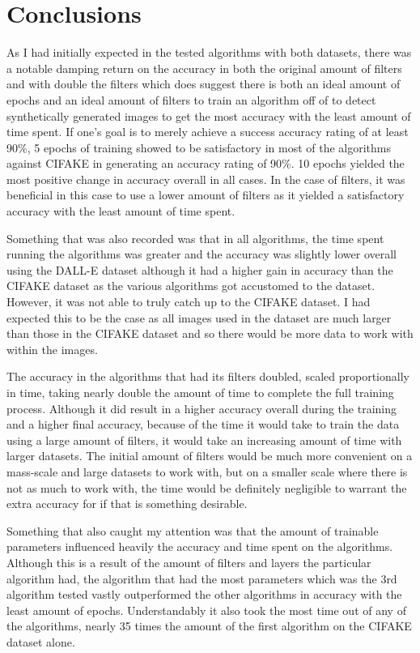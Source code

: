 \documentclass[12pt,letter]{article}
\begin{document}
\newpage
\section{Conclusions}

As I had initially expected in the tested algorithms with both datasets, there was a notable damping return on the accuracy in both the original amount of filters and with double the filters which does suggest there is both an ideal amount of epochs and an ideal amount of filters to train an algorithm off of to detect synthetically generated images to get the most accuracy with  the least amount of time spent. If one's goal is to merely achieve a success accuracy rating of at least 90\%, 5 epochs of training showed to be satisfactory in most of the algorithms against CIFAKE in generating an accuracy rating of 90\%. 10 epochs yielded the most positive change in accuracy overall in all cases. In the case of filters, it was beneficial in this case to use a lower amount of filters as it yielded a satisfactory accuracy with the least amount of time spent. 

Something that was also recorded was that in all algorithms, the time spent running the algorithms was greater and the accuracy was slightly lower overall using the DALL-E dataset although it had a higher gain in accuracy than the CIFAKE dataset as the various algorithms got accustomed to the dataset. However, it was not able to truly catch up to the CIFAKE dataset. I had expected this to be the case as all images used in the dataset are much larger than those in the CIFAKE dataset and so there would be more data to work with within the images.

The accuracy in the algorithms that had its filters doubled, scaled proportionally in time, taking nearly double the amount of time to complete the full training process. Although it did result in a higher accuracy overall during the training and a higher final accuracy, because of the time it would take to train the data using a large amount of filters, it would take an increasing amount of time with larger datasets. The initial amount of filters would be much more convenient on a mass-scale and large datasets to work with, but on a smaller scale where there is not as much to work with, the time would be definitely negligible to warrant the extra accuracy for if that is something desirable.

Something that also caught my attention was that the amount of trainable parameters influenced heavily the accuracy and time spent on the algorithms. Although this is a result of the amount of filters and layers the particular algorithm had, the algorithm that had the most parameters which was the 3rd algorithm tested vastly outperformed the other algorithms in accuracy with the least amount of epochs. Understandably it also took the most time out of any of the algorithms, nearly 35 times the amount of the first algorithm on the CIFAKE dataset alone. 
\end{document}
